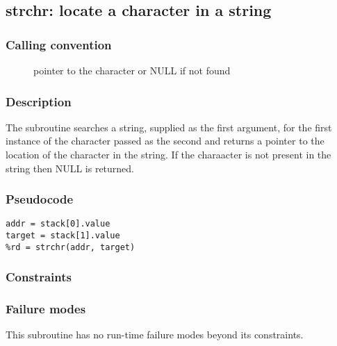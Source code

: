 \clearpage
{}
{}
\label{subr:strchr}
\subsection*{strchr: locate a character in a string}

\subsubsection*{Calling convention}

\begin{description}
\item[] pointer to the character or NULL if not found
\end{description}

\subsubsection*{Description}

The  subroutine searches a string, supplied as the
first argument, for the first instance of the character passed as the
second and returns a pointer to the location of the character in the
string.  If the charaacter is not present in the string then NULL is
returned.

\subsubsection*{Pseudocode}

\begin{verbatim}
addr = stack[0].value
target = stack[1].value
%rd = strchr(addr, target)
\end{verbatim}

\subsubsection*{Constraints}

\subsubsection*{Failure modes}

This subroutine has no run-time failure modes beyond its constraints.
